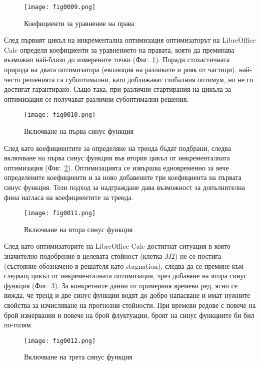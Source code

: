 \begin{figure}[H]
  \centering
  \texttt{[image: fig0009.png]}
  \caption{Коефициенти за уравнение на права}
\label{fig0009}
\end{figure}

След първият цикъл на инкрементална оптимизация оптимизаторът на LibreOffice Calc определя коефициенти за уравнението на правата, която да преминава възможно най-близо до измерените точки (Фиг. \ref{fig0009}). Поради стохастичната природа на двата оптимизатора (еволюция на разликите и рояк от частици), най-често решенията са субоптимални, като доближават глобалния оптимум, но не го достигат гарантирано. Също така, при различни стартирания на цикъла за оптимизация се получават различни субоптимални решения. 

\begin{figure}[H]
  \centering
  \texttt{[image: fig0010.png]}
  \caption{Включване на първа синус функция}
\label{fig0010}
\end{figure}

След като коефициентите за определяне на тренда бъдат подбрани, следва включване на първа синус функция във втория цикъл от инкременталната оптимизация (Фиг. \ref{fig0010}). Оптимизацията се извършва едновременно за вече определените коефициенти и за ново добавените три коефициента на първата синус функция. Този подход за надграждане дава възможност за допълнителна фина нагласа на коефициентите за тренда. 

\begin{figure}[H]
  \centering
  \texttt{[image: fig0011.png]}
  \caption{Включване на втора синус функция}
\label{fig0011}
\end{figure}

След като оптимизаторите на LibreOffice Calc достигнат ситуация в която значително подобрение в целевата стойност (клетка $M2$) не се постига (състояние обозначено в решателя като stagnation), следва да се премине към следващ цикъл от инкременталната оптимизация, чрез добавяне на втора синус функция (Фиг. \ref{fig0011}). За конкретните данни от примерния времеви ред, ясно се вижда, че тренд и две синус функции водят до добро напасване и имат нужните свойства за изчисляване на прогнозни стойности. При времеви редове с повече на брой измервания и повече на брой флуктуации, броят на синус функциите би бил по-голям. 

\begin{figure}[H]
  \centering
  \texttt{[image: fig0012.png]}
  \caption{Включване на трета синус функция}
\label{fig0012}
\end{figure}

